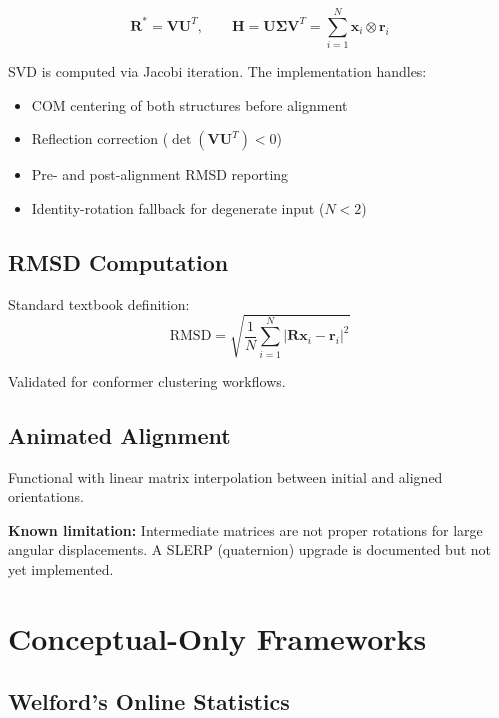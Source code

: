 ﻿\documentclass[11pt]{article}
\begin{document}
\begin{equation}
\mathbf{R}^* = \mathbf{V}\mathbf{U}^T, \qquad
\mathbf{H} = \mathbf{U}\boldsymbol{\Sigma}\mathbf{V}^T = \sum_{i=1}^{N} \mathbf{x}_i \otimes \mathbf{r}_i
\end{equation}

SVD is computed via Jacobi iteration. The implementation handles:
\begin{itemize}
\item COM centering of both structures before alignment
\item Reflection correction ($\det(\mathbf{V}\mathbf{U}^T) < 0$)
\item Pre- and post-alignment RMSD reporting
\item Identity-rotation fallback for degenerate input ($N < 2$)
\end{itemize}

\subsection{RMSD Computation}

Standard textbook definition:
\begin{equation}
\text{RMSD} = \sqrt{\frac{1}{N}\sum_{i=1}^{N} |\mathbf{R}\mathbf{x}_i - \mathbf{r}_i|^2}
\end{equation}

Validated for conformer clustering workflows.

\subsection{Animated Alignment}

Functional with linear matrix interpolation between initial and aligned orientations.

\textbf{Known limitation:} Intermediate matrices are not proper rotations for
large angular displacements. A SLERP (quaternion) upgrade is documented but
not yet implemented.

\section{Conceptual-Only Frameworks}

\subsection{Welford's Online Statistics}
\end{document}
